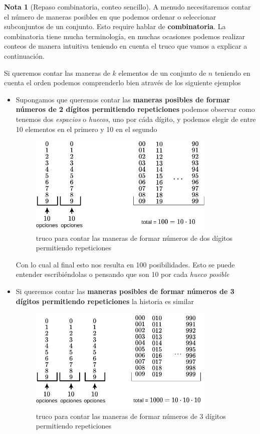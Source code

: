 \documentclass[]{book}
\theoremstyle{plain}
\theoremstyle{definition}
\newtheorem{note}[theorem]{Nota}
\begin{document}
\begin{note}[Repaso combinatoria, conteo sencillo]

A menudo necesitaremos contar el número de maneras posibles en que podemos
ordenar o seleccionar subconjuntos de un conjunto. Esto require hablar de \textbf{combinatoria}.
La combinatoria tiene mucha terminología, en muchas ocasiones podemos 
realizar conteos de manera intuitiva teniendo en cuenta el truco que vamos a explicar a continuación. 

Si queremos contar las maneras de $k$ elementos de un conjunto de $n$ teniendo en cuenta el orden podemos 
comprenderlo bien através de los siguiente ejemplos

\begin{itemize}
  \item Supongamos que queremos contar las \textbf{maneras posibles de formar números de 2 dígitos permitiendo repeticiones} podemos observar como 
tenemos dos \emph{espacios} o \emph{huecos}, uno por cáda dígito, y podemos elegir 
de entre 10 elementos en el primero y 10 en el segundo

\begin{figure}[htbp]
  \centering
  \includegraphics[width=3.5in,height=\textheight]{img/conteo_basico_1.png}
  \caption{truco para contar las maneras de formar números de dos dígitos permitiendo repeticiones}
  \end{figure}%
  
Con lo cual al final esto nos resulta en 100 posibilidades. Esto se puede entender escribiéndolas o pensando que son 10 por cada \emph{hueco posible}

\item Si queremos contar las \textbf{maneras posibles de formar números de 3 dígitos permitiendo repeticiones} la historia es similar

\begin{figure}[htbp]
  \centering
  \includegraphics[width=3.5in,height=\textheight]{img/conteo_basico_2.png}
  \caption{truco para contar las maneras de formar números de 3 dígitos permitiendo repeticiones}
  \end{figure}%
  

\end{itemize}
\end{note}
\end{document}
